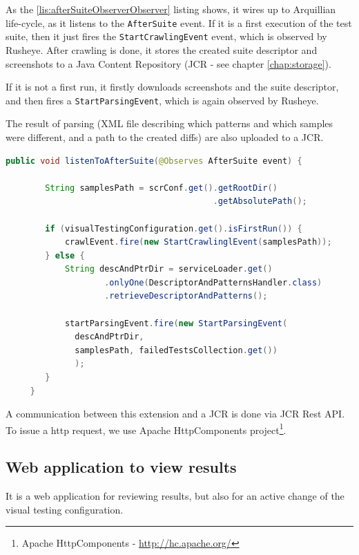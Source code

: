 \documentclass[11pt,oneside,final]{fithesis2}
\begin{document}
    As the \ref{lis:afterSuiteObserverObserver} listing shows, it wires up to Arquillian life-cycle, as it listens to the \texttt{AfterSuite} event. 
    If it is a first execution of the test suite, then it just fires the \texttt{StartCrawlingEvent} event, which is observed by Rusheye. 
    After crawling is done, it stores the created suite descriptor and screenshots to a Java Content Repository 
    (JCR - see chapter \ref{chap:storage}).
    
    If it is not a first run, it firstly downloads screenshots and the suite descriptor, and then fires a \texttt{StartParsingEvent}, 
    which is again observed by Rusheye.
    
    The result of parsing (XML file describing which patterns and which samples were different, and a path to the created diffs) are also uploaded
    to a JCR.
    
    \begin{lstlisting}[caption=AfterSuite observer to controll Rusheye,label=lis:afterSuiteObserverObserver,language=java, breaklines=true]
     public void listenToAfterSuite(@Observes AfterSuite event) {
        
        String samplesPath = scrConf.get().getRootDir()
                                          .getAbsolutePath();
        
        if (visualTestingConfiguration.get().isFirstRun()) {
            crawlEvent.fire(new StartCrawlinglEvent(samplesPath));
        } else {
            String descAndPtrDir = serviceLoader.get()
                    .onlyOne(DescriptorAndPatternsHandler.class)
                    .retrieveDescriptorAndPatterns();
            
            startParsingEvent.fire(new StartParsingEvent(
		      descAndPtrDir,
		      samplesPath, failedTestsCollection.get())
		      );
        }
     }
    \end{lstlisting}
    
    A communication between this extension and a JCR is done via JCR Rest API. To issue a http request, we use Apache HttpComponents
    project\footnote{Apache HttpComponents - \url{http://hc.apache.org/}}.
 
    \subsection{Web application to view results}
    \label{sec:webManagerAppDesc}
    It is a web application for reviewing results, but also for an active change
    of the visual testing configuration.
    
\end{document}
